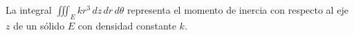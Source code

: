 \item La integral $\iiint_E kr^3 \, dz \, dr \, d\theta$ representa el momento de inercia con respecto al eje $z$ de un sólido $E$ con densidad constante $k$.
